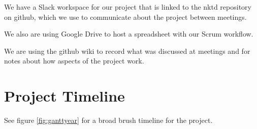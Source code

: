 \documentclass[11pt, oneside]{article}
\newcounter{myWeekNum}
\newcommand{\myWeek}{\themyWeekNum
    \stepcounter{myWeekNum}
    \ifnum\themyWeekNum=53
         \setcounter{myWeekNum}{1}
    \else\fi
}
\begin{document}
We have a Slack workspace for our project that is linked to the nktd
repository on github, which we use to communicate about the project
between meetings.

We also are using Google Drive to host a spreadsheet with our Scrum
workflow.

We are using the github wiki to record what was discussed at meetings
and for notes about how aspects of the project work.


\section*{Project Timeline}

See figure \ref{fig:ganttyear} for a broad brush timeline for the project.

\end{document}
